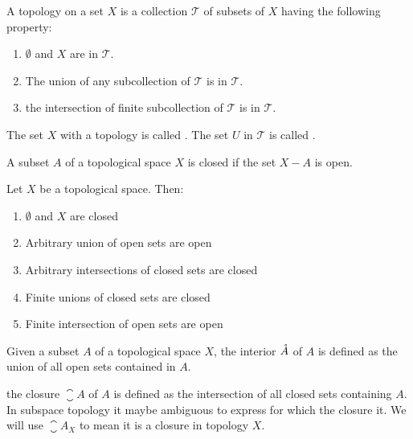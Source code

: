 \begin{definition}
    A topology on a set $X$ is a collection $\mathcal{T}$ of subsets of $X$ having the following property:
    \begin{enumerate}
        \item $\emptyset$ and $X$ are in $\mathcal{T}$.
        \item The union of any subcollection of $\mathcal{T}$ is in $\mathcal{T}$.
        \item the intersection of finite subcollection of $\mathcal{T}$ is in $\mathcal{T}$.
    \end{enumerate}

The set $X$ with a topology is called . The set $U$ in $\mathcal{T}$ is called .
\end{definition}

\begin{definition}
    A subset $A$ of a topological space $X$ is closed if the set $X - A$ is open.
\end{definition}

\begin{definition}
    Let $X$ be a topological space. Then:
    \begin{enumerate}
        \item $\emptyset$ and $X$ are closed
        \item Arbitrary union of open sets are open
        \item Arbitrary intersections of closed sets are closed
        \item Finite unions of closed sets are closed
        \item Finite intersection of open sets are open
    \end{enumerate}
\end{definition}


\begin{definition}
    Given a subset $A$ of a topological space $X$, the interior $\mathring{A}$ of $A$ is defined as the union of all open sets contained in $A$.
\end{definition}

\begin{definition}
    the closure $\closure{A}$ of $A$ is defined as the intersection of all closed sets containing $A$. In subspace topology it maybe ambiguous to express for which the closure it. We will use $\closure{A}_X$ to mean it is a closure in topology $X$.
\end{definition}

